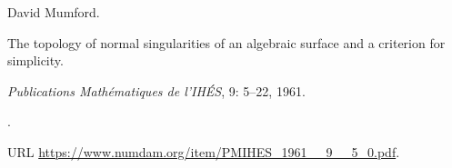 David Mumford.

\newblock The topology of normal singularities of an algebraic surface and a
  criterion for simplicity.

\newblock \emph{Publications Mathématiques de l'IHÉS}, 9: 5--22,
  1961.

\newblock {}.

\newblock URL \url{https://www.numdam.org/item/PMIHES_1961__9__5_0.pdf}.

